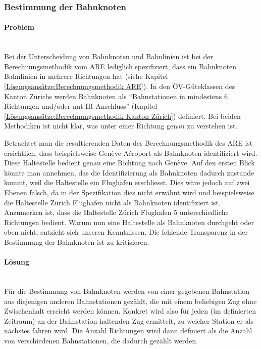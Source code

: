 \subsubsection{Bestimmung der Bahnknoten}
\label{Verbesserungsmöglichkeiten:Bestimmung der Bahnknoten}

\paragraph{Problem}~\\
Bei der Unterscheidung von Bahnknoten und Bahnlinien ist bei der Berechnungsmethodik vom \acs{ARE} lediglich spezifiziert, dass ein Bahnknoten Bahnlinien in mehrere Richtungen hat (siehe Kapitel \ref{Lösungsansätze:Berechnungsmethodik ARE}).
In den ÖV-Güteklassen des Kanton Zürichs werden Bahnknoten als "`Bahnstationen in mindestens 6 Richtungen und/oder nut IR-Anschluss"' (Kapitel \ref{Lösungsansätze:Berechnungsmethodik Kanton Zürich}) definiert.
Bei beiden Methodiken ist nicht klar, was unter einer Richtung genau zu verstehen ist.

Betrachtet man die resultierenden Daten der Berechnungsmethodik des \acs{ARE} ist ersichtlich, dass beispielsweise Genève-Aéroport als Bahnknoten identifiziert wird.
Diese \gls{Haltestelle} bedient genau eine Richtung nach Genève.
Auf den ersten Blick könnte man annehmen, das die Identifizierung als Bahnknoten dadurch zustande kommt, weil die \gls{Haltestelle} ein Flughafen erschliesst.
Dies wäre jedoch auf zwei Ebenen falsch, da in der Spezifikation dies nicht erwähnt wird und beispielsweise die \gls{Haltestelle} Zürich Flughafen nicht als Bahnknoten identifiziert ist.
Anzumerken ist, dass die \gls{Haltestelle} Zürich Flughafen 5 unterschiedliche Richtungen bedient.
Warum nun eine \gls{Haltestelle} als Bahnknoten durchgeht oder eben nicht, entzieht sich unseren Kenntnissen.
Die fehlende Transparenz in der Bestimmung der Bahnknoten ist zu kritisieren.

\paragraph{Lösung}~\\
Für die Bestimmung von Bahnknoten werden von einer gegebenen Bahnstation aus diejenigen anderen Bahnstationen gezählt, die mit einem beliebigen Zug ohne Zwischenhalt erreicht werden können.
Konkret wird also für jeden (im definierten Zeitraum) an der Bahnstation haltenden Zug ermittelt, zu welcher Station er als nächstes fahren wird.
Die Anzahl Richtungen wird dann definiert als die Anzahl von verschiedenen Bahnstationen, die dadurch gezählt werden.
